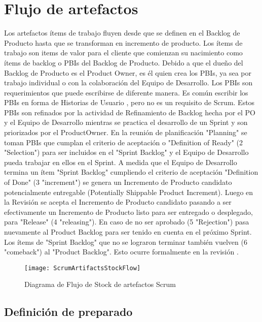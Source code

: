 \section{Flujo de artefactos}

Los artefactos ítems de trabajo fluyen desde que se definen en el Backlog de Producto hasta que se transforman en incremento de producto. Los ítems de trabajo son items de valor para el cliente que comienzan su nacimiento como ítems de backlog o PBIs del Backlog de Producto. Debido a que el dueño del Backlog de Producto es el Product Owner, es él quien crea los PBIs, ya sea por trabajo individual o con la colaboración del Equipo de Desarrollo. Los PBIs son requerimientos que puede escribirse de diferente manera. Es común escribir los PBIs en forma de Historias de Usuario \cite{Cohn-2004}, pero no es un requisito de Scrum. Estos PBIs son refinados por la actividad de Refinamiento de Backlog hecha por el PO y el Equipo de Desarrollo mientras se practica el desarrollo de un Sprint y son priorizados por el ProductOwner. En la reunión de planificación "Planning" se toman PBIs que cumplan el criterio de aceptación o "Definition of Ready" (2 "Selection") para ser incluidos en el "Sprint Backlog" y el Equipo de Desarrollo pueda trabajar en ellos en el Sprint. A medida que el Equipo de Desarrollo termina un ítem "Sprint Backlog" cumpliendo el criterio de aceptación "Definition of Done" (3 "increment") se genera un Incremento de Producto candidato potencialmente entregable (Potentially Shippable Product Increment). Luego en la Revisión se acepta el Incremento de Producto candidato pasando a ser efectivamente un Incremento de Producto listo para ser entregado o desplegado, para "Release" (4 "releasing"). En caso de no ser aprobado (5 "Rejection") pasa nuevamente al Product Backlog para ser tenido en cuenta en el próximo Sprint. Los ítems de "Sprint Backlog" que no se lograron terminar también vuelven (6 "comeback") al "Product Backlog". Esto ocurre formalmente en la revisión \cite{Martin-Alaimo-2014}.

\begin{figure}[h]
  \centering
  \texttt{[image: ScrumArtifactsStockFlow]}
  \caption{Diagrama de Flujo de Stock de artefactos Scrum}
  \centering
  \label{fig:ScrumArtifactsStockFlow} 
\end{figure}

\subsection{Definición de preparado}

